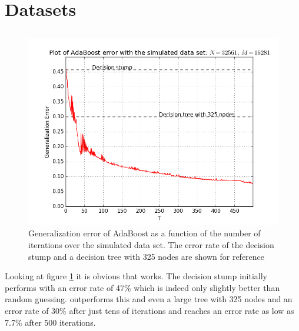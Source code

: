 \section{Datasets}
\subsection{\adaB}
\label{subsec:AdaPracPerf}
\begin{figure}[!ht]
  \centering
      \includegraphics[width=\graphWidth]{generated/ADGD.png}
  \caption{Generalization error of AdaBoost as a function of the number of iterations over the simulated data set. The error rate of the decision stump and a decision tree with 325 nodes are shown for reference}
      \label{fig:adaBGD}
\end{figure}


\par Looking at figure \ref{fig:adaBGD} it is obvious that \adaB works. The decision stump initially performs with an error rate of 47\% which is indeed only slightly better than random guessing. \adaB outperforms this and even a large tree with 325 nodes and an error rate of 30\% after just tens of iterations and reaches an error rate as low as 7.7\% after 500 iterations.

